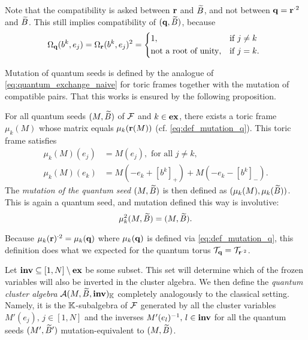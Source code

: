 \begin{remark}
	Note that the compatibility is asked between $\mathbf{r}$ and $\widetilde{B}$, and not between $\mathbf{q} = \mathbf{r}^{\cdot 2}$ and $\widetilde{B}$. This still implies compatibility of $(\mathbf{q}, \widetilde{B})$, because
	\begin{equation*}
		\Omega_\bbq(b^k, e_j) = \Omega_\bbr(b^k, e_j)^2 = \begin{dcases*}
			1,                          & if $j \neq k$ \\
			\text{not a root of unity}, & if $j = k$.
		\end{dcases*}
	\end{equation*}
\end{remark}

Mutation of quantum seeds is defined by the analogue of
\cref{eq:quantum_exchange_naive} for toric frames together with the mutation of
compatible pairs. That this works is ensured by the following proposition.
\begin{proposition}\label{prop:formula_for_mutation}

	For all quantum seeds $(M, \widetilde{B})$ of $\mathcal{F}$ and $k\in \mathbf{ex}$, there exists a toric frame
	$\mu_k(M)$ whose matrix equals $\mu_k(\mathbf{r}(M))$ (cf. \cref{eq:def_mutation_q}). This
	toric frame satisfies
	\begin{align*}
		\mu_k(M)(e_j) & = M(e_j), \text{ for all } j \neq k,         \\
		\mu_k(M)(e_k) & = M(-e_k + [b^k]_{+}) + M(-e_k - [b^k]_{-}).
	\end{align*}
	The \emph{mutation of the quantum seed} $(M, \widetilde{B})$ is then
	defined as $(\mu_k(M), \mu_k(\widetilde{B}))$. This is again a quantum seed, and mutation defined
	this way is involutive:
	\begin{equation*}
		\mu^2_k (M, \widetilde{B}) = (M, \widetilde{B}).
	\end{equation*}
\end{proposition}
\begin{remark}

	Because $\mu_k(\mathbf{r})^{\cdot 2} = \mu_k(\mathbf{q})$ where $\mu_k(\mathbf{q})$ is defined via
	\cref{eq:def_mutation_q}, this definition does what we expected for the quantum torus
	$\mathcal{T}_{\mathbf{q}} = \mathcal{T}_{\mathbf{r}^{\cdot 2}}$.
\end{remark}

Let $\mathbf{inv} \subseteq [1, N]\setminus \mathbf{ex}$ be some subset. This set will determine which
of the frozen variables will also be inverted in the cluster algebra. We then define
the \emph{quantum cluster algebra} $\mathcal{A}(M, \widetilde{B},
	\mathbf{inv})_{\mathbb{K}}$ completely analogously to the classical setting. Namely, it is the
$\mathbb{K}$-subalgebra of $\mathcal{F}$ generated by all the cluster variables $M'(e_j), \, j \in
	[1, N]$ and the inverses $M'(e_l)^{-1}, \, l \in \mathbf{inv}$ for all the quantum seeds $(M',
	\widetilde{B}')$ mutation-equivalent to $(M, \widetilde{B})$.

